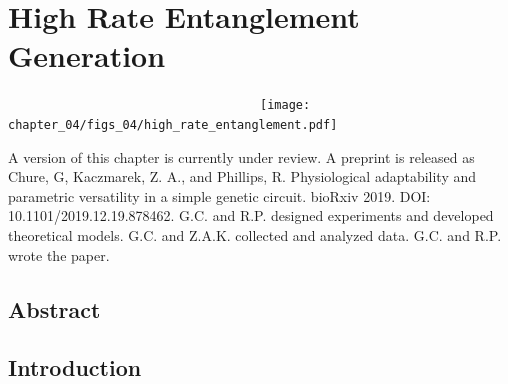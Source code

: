 \documentclass[12pt]{caltech_thesis}
\begin{document}
\hypertarget{high-rate-entanglement-generation}{%
\chapter{High Rate Entanglement
Generation}\label{high-rate-entanglement-generation}}

~~~~~~~~~~~~~~~~~~~~~~~~~~~~~~~~~~~~\texttt{[image: chapter\_04/figs\_04/high\_rate\_entanglement.pdf]}

A version of this chapter is currently under review. A preprint is
released as Chure, G, Kaczmarek, Z. A., and Phillips, R. Physiological
adaptability and parametric versatility in a simple genetic circuit.
bioRxiv 2019. DOI: 10.1101/2019.12.19.878462. G.C. and R.P. designed
experiments and developed theoretical models. G.C. and Z.A.K. collected
and analyzed data. G.C. and R.P. wrote the paper.

\hypertarget{abstract-3}{%
\section{Abstract}\label{abstract-3}}

\hypertarget{introduction-3}{%
\section{Introduction}\label{introduction-3}}
\end{document}
